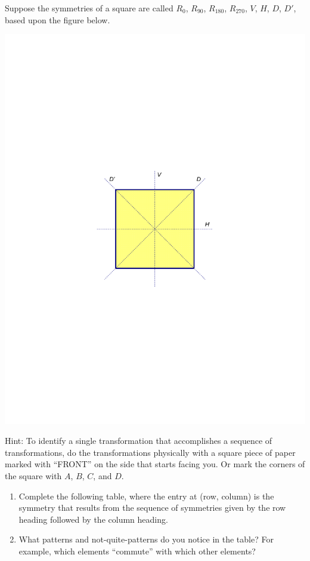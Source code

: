 \documentclass[handout]{ximera}
\begin{document}
\begin{problem}
Suppose the symmetries of a square are called $R_0$, $R_{90}$, $R_{180}$, $R_{270}$, $V$, $H$, $D$, $D'$, based upon the figure below.  
\begin{image}
\includegraphics[scale=0.6]{D4.pdf}
\end{image}
Hint:  To identify a single transformation that accomplishes a sequence of transformations, do the transformations physically with a square piece of paper marked with ``FRONT'' on the side that starts facing you.  Or mark the corners of the square with $A$, $B$, $C$, and $D$.  
\begin{enumerate}
\item Complete the following table, where the entry at (row, column) is the symmetry that results from the sequence of symmetries given by the row heading followed by the column heading.  
\item What patterns and not-quite-patterns do you notice in the table?  For example, which elements ``commute'' with which other elements?

\end{enumerate}
\end{problem}
\end{document}
